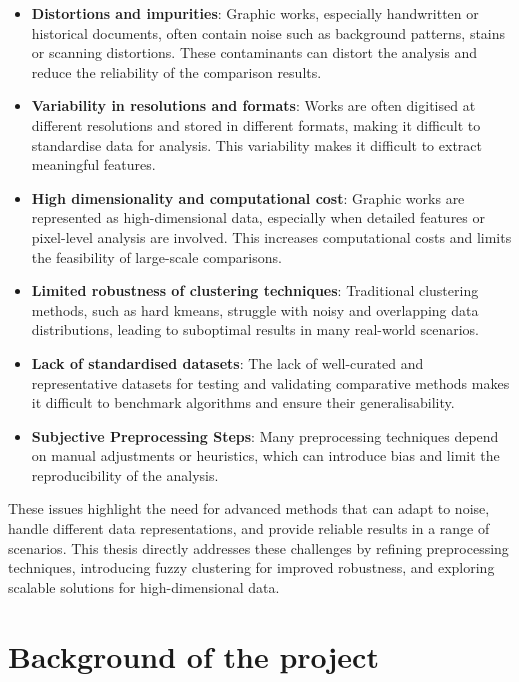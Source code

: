 \begin{toReview}
		\begin{itemize}
			\item \textbf{Distortions and impurities}: Graphic works, especially handwritten or historical documents, often contain noise such as background patterns, stains or scanning distortions. These contaminants can distort the analysis and reduce the reliability of the comparison results.
			\item \textbf{Variability in resolutions and formats}: Works are often digitised at different resolutions and stored in different formats, making it difficult to standardise data for analysis. This variability makes it difficult to extract meaningful features.
			\item \textbf{High dimensionality and computational cost}: Graphic works are represented as high-dimensional data, especially when detailed features or pixel-level analysis are involved. This increases computational costs and limits the feasibility of large-scale comparisons.
			\item \textbf{Limited robustness of clustering techniques}: Traditional clustering methods, such as hard \gls{kmeans}, struggle with noisy and overlapping data distributions, leading to suboptimal results in many real-world scenarios.
			\item \textbf{Lack of standardised datasets}: The lack of well-curated and representative datasets for testing and validating comparative methods makes it difficult to benchmark algorithms and ensure their generalisability.
			\item \textbf{Subjective Preprocessing Steps}: Many preprocessing techniques depend on manual adjustments or heuristics, which can introduce bias and limit the reproducibility of the analysis.
		\end{itemize}

		\noindent These issues highlight the need for advanced methods that can adapt to noise, handle different data representations, and provide reliable results in a range of scenarios. This thesis directly addresses these challenges by refining preprocessing techniques, introducing fuzzy clustering for improved robustness, and exploring scalable solutions for high-dimensional data.

	\section{Background of the project}

\end{toReview}

